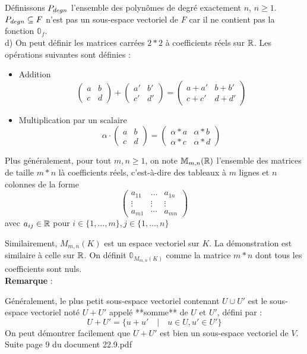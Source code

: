 \documentclass[12pt]{article}
\begin{document}
Définissons $P_{deg \space n}$ l'ensemble des polynômes de degré exactement $n$, $n \geq 1$.
$P_{deg \space n} \subseteq F$ n'est pas un sous-espace vectoriel de $F$ car il ne contient pas la fonction $\mathbb 0_f$.
\\
d) On peut définir les matrices carrées $2*2$ à coefficients réels sur $\mathbb{R}$. Les opérations suivantes sont définies :
\begin{itemize}
    \item Addition
    $$
    \begin{pmatrix}
    a & b \\ c & d
    \end{pmatrix} +\begin{pmatrix}
    a' & b' \\ c' & d'
    \end{pmatrix} = \begin{pmatrix}
    a+a' & b+b' \\ c+c' & d+d'
    \end{pmatrix}$$
    \item  Multiplication par un scalaire
    $$
    \alpha \cdot \begin{pmatrix}
    a & b \\ c & d
    \end{pmatrix} = \begin{pmatrix}
    \alpha * a &  \alpha *b \\ \alpha*c & \alpha*d
    \end{pmatrix}
    $$
\end{itemize}
Plus généralement, pour tout $m,n \geq 1$, on note $\mathbb M_{m,n}(\mathbb{R})$ l'ensemble des matrices de taille $m*n$ là coefficients réels, c'est-à-dire des tableaux à $m$ lignes et $n$ colonnes de la forme
$$\begin{pmatrix}
a_{11} & \dots & a_{1n} \\ \vdots & \vdots & \vdots
\\
a_{m1} & \cdots & a_{mn}
\end{pmatrix} 
$$
avec $a_{ij} \in \mathbb{R}$ pour $i \in \{1, \dots, m\}, j \in \{1, \dots, n\}$ 

Similairement, $M_{m,n}(K)$ est un espace vectoriel sur $K$. La démonstration est similaire à celle sur $\mathbb{R}$.
On définit $\mathbb 0_{M_{m,n}(K)}$ comme la matrice $m*n$ dont tous les coefficients sont nuls. \\
\textbf{Remarque} :

Généralement, le plus petit sous-espace vectoriel contenant $U \cup U'$ est le sous-espace vectoriel noté $U + U'$ appelé **somme** de $U$ et $U'$, défini par :
$$
U +U ' = \{u+u' \quad | \quad u \in U, u' \in U'\}$$
On peut démontrer facilement que $U+U'$ est bien un sous-espace vectoriel de $V$.
\\
Suite page 9 du document 22.9.pdf
\end{document}
